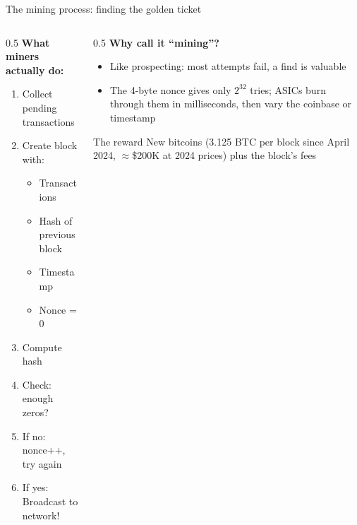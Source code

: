 \ifdefined\PRESENTATION\else\PassOptionsToClass{handout}{beamer}\fi\documentclass[aspectratio=169, lualatex]{beamer}
\begin{document}
\begin{frame}{The mining process: finding the golden ticket}
	\begin{columns}[c]
		\begin{column}{0.5\textwidth}
			\textbf{What miners actually do:}
			\begin{enumerate}
				\item Collect pending transactions
				\item Create block with:
				      \begin{itemize}
					      \item Transactions
					      \item Hash of previous block
					      \item Timestamp
					      \item Nonce = 0
				      \end{itemize}
				\item Compute hash
				\item Check: enough zeros?
				\item If no: nonce++, try again
				\item If yes: Broadcast to network!
			\end{enumerate}
		\end{column}
		\begin{column}{0.5\textwidth}
			\textbf{Why call it ``mining''?}
			\begin{itemize}
				\item Like prospecting: most attempts fail, a find is valuable
				\item The 4-byte nonce gives only $2^{32}$ tries; ASICs burn through them in milliseconds, then vary the coinbase or timestamp
			\end{itemize}
			\begin{exampleblock}{The reward}
				New bitcoins (3.125 BTC per block since April 2024, $\approx$\$200K at 2024 prices) plus the block's fees
			\end{exampleblock}
		\end{column}
	\end{columns}
\end{frame}
\end{document}

